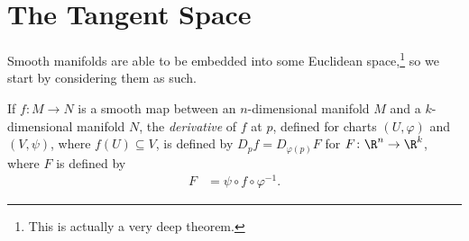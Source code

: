\documentclass[10pt]{mypackage}
\begin{document}
\section{The Tangent Space}%
Smooth manifolds are able to be embedded into some Euclidean space,\footnote{This is actually a very deep theorem.} so we start by considering them as such.
\begin{definition}
  If $f\colon M\rightarrow N$ is a smooth map between an $n$-dimensional manifold $M$ and a $k$-dimensional manifold $N$, the \textit{derivative} of $f$ at $p$, defined for charts $\left( U,\varphi \right)$ and $\left( V,\psi \right)$, where $f(U)\subseteq V$, is defined by $D_pf = D_{\varphi(p)}F$ for $F\colon \R^{n}\rightarrow \R^{k}$, where $F$ is defined by
  \begin{align*}
    F &= \psi\circ f \circ \varphi^{-1}.
  \end{align*}
\end{definition}
\end{document}
